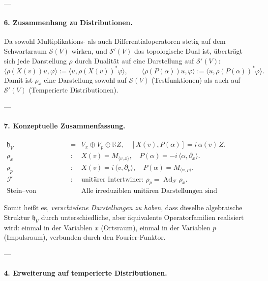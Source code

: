 \documentclass[10pt, letterpaper]{article}
\newcommand{\Ad}{\operatorname{Ad}}
\newcommand{\R}{\mathbb{R}}
\begin{document}
---

\paragraph{6. Zusammenhang zu Distributionen.}

Da sowohl Multiplikations- als auch Differentialoperatoren
stetig auf dem Schwartzraum $\mathcal{S}(V)$ wirken,
und $\mathcal{S}'(V)$ das topologische Dual ist,
überträgt sich jede Darstellung $\rho$ durch Dualität auf
eine Darstellung auf $\mathcal{S}'(V)$:
\[
\langle \rho(X(v))u,\varphi\rangle
:=\langle u,\rho(X(v))^\ast\varphi\rangle,\qquad
\langle \rho(P(\alpha))u,\varphi\rangle
:=\langle u,\rho(P(\alpha))^\ast\varphi\rangle.
\]
Damit ist $\rho_x$ eine Darstellung sowohl auf
$\mathcal{S}(V)$ (Testfunktionen) als auch auf
$\mathcal{S}'(V)$ (Temperierte Distributionen).

---

\paragraph{7. Konzeptuelle Zusammenfassung.}

\[
\boxed{
\begin{array}{rcl}
\mathfrak{h}_V &=& V_x\oplus V_p\oplus \R Z,
\quad [X(v),P(\alpha)]=i\,\alpha(v)\,Z. \\[4pt]
\rho_x &: & X(v)=M_{\langle v,x\rangle},\quad P(\alpha)=-i\,\langle\alpha,\partial_x\rangle.\\[4pt]
\rho_p &: & X(v)=i\,\langle v,\partial_p\rangle,\quad P(\alpha)=M_{\langle\alpha,p\rangle}.\\[4pt]
\mathcal{F} &: & \text{unitärer Intertwiner: } \rho_p=\Ad_{\mathcal{F}}\rho_x.\\[4pt]
\text{Stein--von Neumann:} & & \text{Alle irreduziblen unitären Darstellungen sind äquivalent.}
\end{array}
}
\]

Somit heißt es, \emph{verschiedene Darstellungen zu haben},
dass dieselbe algebraische Struktur $\mathfrak{h}_V$
durch unterschiedliche, aber äquivalente Operatorfamilien realisiert wird:
einmal in der Variablen $x$ (Ortsraum), einmal in der Variablen $p$ (Impulsraum),
verbunden durch den Fourier-Funktor.


---

\paragraph{4. Erweiterung auf temperierte Distributionen.}
\end{document}
